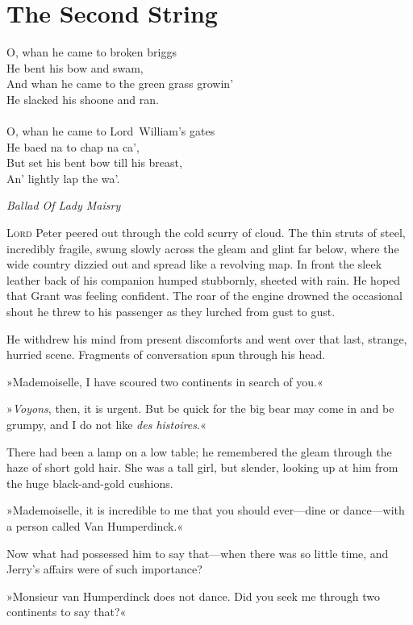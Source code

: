 
\chapter{The Second String}

\epigraph{
O, whan he came to broken briggs\\
He bent his bow and swam,\\
And whan he came to the green grass growin'\\
He slacked his shoone and ran.\\
~\\
O, whan he came to Lord~William's gates\\
He baed na to chap na ca',\\
But set his bent bow till his breast,\\
An' lightly lap the wa'.}{\textit{Ballad Of Lady Maisry}}



\lettrine[lines=4]{L}{ord} Peter peered out through the cold scurry of cloud. The thin
struts of steel, incredibly fragile, swung slowly across the gleam
and glint far below, where the wide country dizzied out and spread
like a revolving map. In front the sleek leather back of his companion
humped stubbornly, sheeted with rain. He hoped that Grant was feeling
confident. The roar of the engine drowned the occasional shout he threw
to his passenger as they lurched from gust to gust.

He withdrew his mind from present discomforts and went over that last,
strange, hurried scene. Fragments of conversation spun through his head.

»Mademoiselle, I have scoured two continents in search of you.«

»\textit{Voyons}, then, it is urgent. But be quick for the big bear may come
in and be grumpy, and I do not like \textit{des histoires}.«

There had been a lamp on a low table; he remembered the gleam through
the haze of short gold hair. She was a tall girl, but slender, looking
up at him from the huge black-and-gold cushions.

»Mademoiselle, it is incredible to me that you should ever—dine or
dance—with a person called Van Humperdinck.«

Now what had possessed him to say that—when there was so little time,
and Jerry's affairs were of such importance?

»Monsieur van Humperdinck does not dance. Did you seek me through two
continents to say that?«


